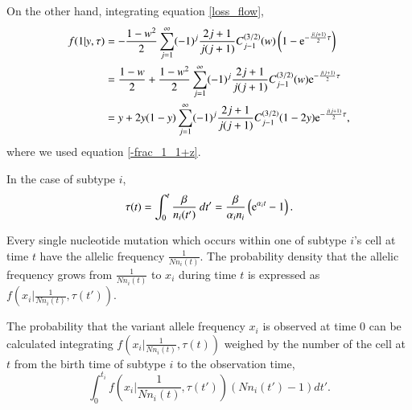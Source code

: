 \documentclass{article}
\begin{document}
On the other hand, integrating equation \eqref{loss_flow},
\begin{align}
 f(1|y,\tau) & = - \frac{1-w^2}{2} \sum_{j=1}^{\infty} (-1)^j \frac{2j+1}{j(j+1)} C^{(3/2)}_{j-1} (w) \left(1 - \mathrm{e}^{-\frac{j(j+1)}{2}\tau} \right)\\
 & = \frac{1-w}{2} + \frac{1-w^2}{2} \sum_{j=1}^{\infty} (-1)^j \frac{2j+1}{j(j+1)} C^{(3/2)}_{j-1} (w) \mathrm{e}^{-\frac{j(j+1)}{2}\tau}\\
 & = y + 2y(1-y) \sum_{j=1}^{\infty} (-1)^j \frac{2j+1}{j(j+1)} C^{(3/2)}_{j-1} (1-2y) \mathrm{e}^{-\frac{j(j+1)}{2}\tau},\label{loss}
\end{align}
where we used equation \eqref{-frac_1_1+z}.

In the case of subtype $i$,
\begin{equation}
 \tau(t) = \int_{0}^{t} \frac{\beta}{n_i(t')} \: dt' = \frac{\beta}{\alpha_i n_i}\left(\mathrm{e}^{\alpha_i t} - 1\right).
\end{equation}

Every single nucleotide mutation which occurs within one of subtype $i$'s cell at time $t$ have the allelic frequency $\frac{1}{Nn_i(t)}$.
The probability density that the allelic frequency grows from $\frac{1}{Nn_i(t)}$ to $x_i$ during time $t$ is expressed as $f(x_i| \frac{1}{Nn_i(t)}, \tau(t'))$.

The probability that the variant allele frequency $x_i$ is observed at time 0 can be calculated integrating $f\left(x_i| \frac{1}{Nn_i(t)}, \tau(t)\right)$ weighed by the number of the cell at $t$ from the birth time of subtype $i$ to the observation time,
\begin{equation}
 \int_{0}^{t_i} f\left(x_i| \frac{1}{Nn_i(t)}, \tau(t')\right) (Nn_i(t')-1)  dt'.\label{vaf_dist_unnorm}
\end{equation}
\end{document}
